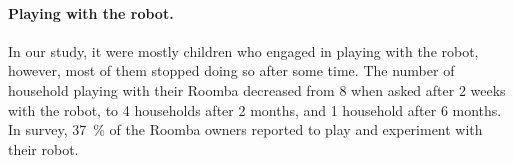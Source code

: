 \documentclass{frontiersSCNS} %
\begin{document}
\paragraph*{Playing with the robot.} In our study, it were mostly children who
engaged in playing with the robot, however, most of them stopped doing so after
some time. The number of household playing with their Roomba decreased from 8
when asked after 2 weeks with the robot, to 4 households after 2 months, and 1
household after 6 months. In \cite{sung_housewives_2008} survey, 37~\% of the
Roomba owners reported to play and experiment with their robot.\\ 


\end{document}

